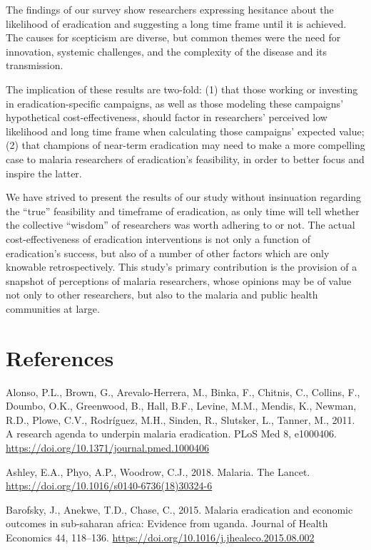 \documentclass[]{article}
\begin{document}
The findings of our survey show researchers expressing hesitance about
the likelihood of eradication and suggesting a long time frame until it
is achieved. The causes for scepticism are diverse, but common themes
were the need for innovation, systemic challenges, and the complexity of
the disease and its transmission.

The implication of these results are two-fold: (1) that those working or
investing in eradication-specific campaigns, as well as those modeling
these campaigns' hypothetical cost-effectiveness, should factor in
researchers' perceived low likelihood and long time frame when
calculating those campaigns' expected value; (2) that champions of
near-term eradication may need to make a more compelling case to malaria
researchers of eradication's feasibility, in order to better focus and
inspire the latter.

We have strived to present the results of our study without insinuation
regarding the ``true'' feasibility and timeframe of eradication, as only
time will tell whether the collective ``wisdom'' of researchers was
worth adhering to or not. The actual cost-effectiveness of eradication
interventions is not only a function of eradication's success, but also
of a number of other factors which are only knowable retrospectively.
This study's primary contribution is the provision of a snapshot of
perceptions of malaria researchers, whose opinions may be of value not
only to other researchers, but also to the malaria and public health
communities at large.

\section*{References}\label{references}

\hypertarget{refs}{}
\hypertarget{ref-Alonso2011}{}
Alonso, P.L., Brown, G., Arevalo-Herrera, M., Binka, F., Chitnis, C.,
Collins, F., Doumbo, O.K., Greenwood, B., Hall, B.F., Levine, M.M.,
Mendis, K., Newman, R.D., Plowe, C.V., Rodríguez, M.H., Sinden, R.,
Slutsker, L., Tanner, M., 2011. A research agenda to underpin malaria
eradication. PLoS Med 8, e1000406.
\url{https://doi.org/10.1371/journal.pmed.1000406}

\hypertarget{ref-Ashley2018}{}
Ashley, E.A., Phyo, A.P., Woodrow, C.J., 2018. Malaria. The Lancet.
\url{https://doi.org/10.1016/s0140-6736(18)30324-6}

\hypertarget{ref-Barofsky2015}{}
Barofsky, J., Anekwe, T.D., Chase, C., 2015. Malaria eradication and
economic outcomes in sub-saharan africa: Evidence from uganda. Journal
of Health Economics 44, 118--136.
\url{https://doi.org/10.1016/j.jhealeco.2015.08.002}
\end{document}
